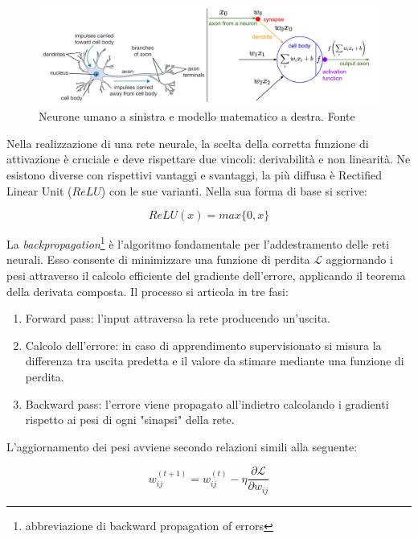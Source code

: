 \begin{figure}[h]
    \centering
    \includegraphics[width=0.85\linewidth]{immagini/neurone_umano_virtuale.png}
    \caption{Neurone umano a sinistra e modello matematico a destra. Fonte \cite{smart2023balappan}}
    \label{fig:neuron}
\end{figure}

Nella realizzazione di una rete neurale, la scelta della corretta funzione di attivazione è cruciale e deve rispettare due vincoli: derivabilità e non linearità. Ne esistono diverse con rispettivi vantaggi e svantaggi, la più diffusa è Rectified Linear Unit ($ReLU$) con le sue varianti. Nella sua forma di base si scrive:

\begin{equation}
    ReLU(x)= max\{0,x\}
\end{equation}

La \textit{backpropagation}\footnote{abbreviazione di backward propagation of errors} è l'algoritmo fondamentale per l’addestramento delle reti neurali. Esso consente di minimizzare una funzione di perdita $\mathcal{L}$ aggiornando i pesi attraverso il calcolo efficiente del gradiente dell’errore, applicando il teorema della derivata composta. Il processo si articola in tre fasi:

\begin{enumerate}
    \item Forward pass: l’input attraversa la rete producendo un’uscita.
    \item Calcolo dell’errore: in caso di apprendimento supervisionato si misura la differenza tra uscita predetta e il valore da stimare mediante una funzione di perdita.
    \item Backward pass: l’errore viene propagato all’indietro calcolando i gradienti rispetto ai pesi di ogni "sinapsi" della rete.
\end{enumerate}

L’aggiornamento dei pesi avviene secondo relazioni simili alla seguente:

\begin{equation}
    w_{ij}^{(t+1)} = w_{ij}^{(t)} - \eta \frac{\partial \mathcal{L}}{\partial w_{ij}}
\end{equation}

